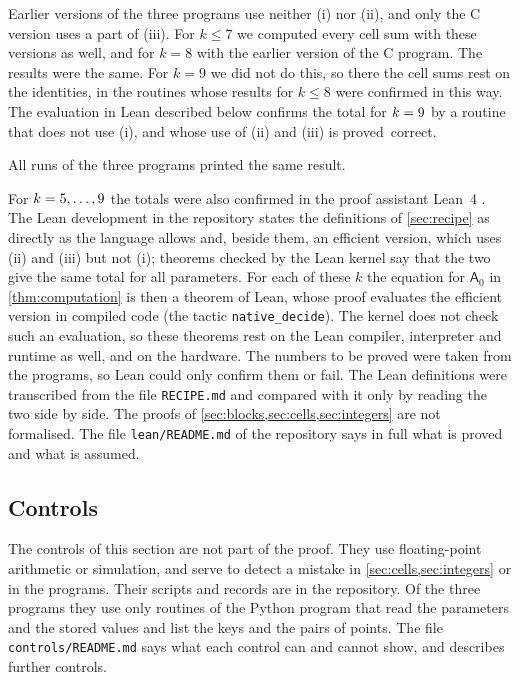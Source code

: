  Earlier versions of the three programs use neither (i) nor (ii), and only the C version uses a part of (iii). For $k\le7$ we computed every cell sum with these versions as well, and for $k=8$ with the earlier version of the C program. The results were the same. For $k=9$ we did not do this, so there the cell sums rest on the identities, in the routines whose results for $k\le8$ were confirmed in this way. The evaluation in Lean described below confirms the total for $k=9$ by a routine that does not use (i), and whose use of (ii) and (iii) is proved~correct.

All runs of the three programs printed the same result.

 For $k=5,\dots,9$ the totals were also confirmed in the proof assistant Lean~4 \cite{Lean4}. The Lean development in the repository states the definitions of \cref{sec:recipe} as directly as the language allows and, beside them, an efficient version, which uses (ii) and (iii) but not (i); theorems checked by the Lean kernel say that the two give the same total for all parameters. For each of these $k$ the equation for $\mathsf{A}_0$ in \cref{thm:computation} is then a theorem of Lean, whose proof evaluates the efficient version in compiled code (the tactic \texttt{native\_decide}). The kernel does not check such an evaluation, so these theorems rest on the Lean compiler, interpreter and runtime as well, and on the hardware. The numbers to be proved were taken from the programs, so Lean could only confirm them or fail. The Lean definitions were transcribed from the file \texttt{RECIPE.md} and compared with it only by reading the two side by side. The proofs of \cref{sec:blocks,sec:cells,sec:integers} are not formalised. The file \texttt{lean/README.md} of the repository says in full what is proved and what is assumed.

\subsection{Controls}\label{sec:controls}

The controls of this section are not part of the proof. They use floating-point arithmetic or simulation, and serve to detect a mistake in \cref{sec:cells,sec:integers} or in the programs. Their scripts and records are in the repository. Of the three programs they use only routines of the Python program that read the parameters and the stored values and list the keys and the pairs of points. The file \texttt{controls/README.md} says what each control can and cannot show, and describes further controls.

